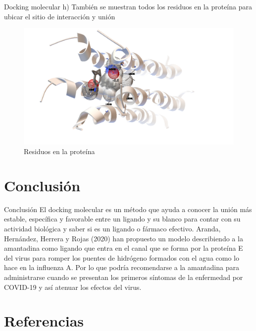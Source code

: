 \documentclass[11pt]{beamer}
\begin{document}
			
			
				\begin{frame}{Docking molecular}
			\justifying 
				 h) También se muestran todos los residuos en la proteína para ubicar el sitio de interacción y unión
			
			\begin{figure}[H]
				\centering
				\includegraphics[scale=0.25]{Interaccion.png}
				\caption{Residuos en la proteína}
				\label{fig: Figura1}
			\end{figure}
		\end{frame} 
		
			

	
	\section{Conclusión}
		\begin{frame}{Conclusión}
			\justifying El docking molecular es un método que ayuda a conocer la unión más estable, específica y favorable entre un ligando y su blanco para contar con su actividad biológica y saber si es un ligando o fármaco efectivo.
Aranda, Hernández, Herrera y Rojas (2020) han propuesto un modelo describiendo a la amantadina como ligando que entra en el canal que se forma por la proteína E del virus para romper los puentes de hidrógeno formados con el agua como lo hace en la influenza A. Por lo que podría recomendarse a la amantadina para administrarse cuando se presentan los primeros síntomas de la enfermedad por COVID-19 y así atenuar los efectos del virus.
		\end{frame}
	
	

\section{Referencias}
\end{document}
